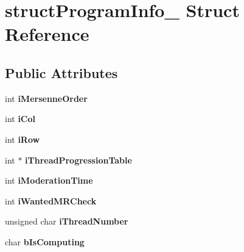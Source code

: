 \hypertarget{structstructProgramInfo__}{
\section{structProgramInfo\_\- Struct Reference}
\label{structstructProgramInfo__}
}
\subsection*{Public Attributes}
\begin{DoxyCompactItemize}
\item 
\hypertarget{structstructProgramInfo___a429213cd5f97e2a1c42e57535ade034a}{
int {\bfseries iMersenneOrder}}
\label{structstructProgramInfo___a429213cd5f97e2a1c42e57535ade034a}

\item 
\hypertarget{structstructProgramInfo___a6d8f0f882c5260a07f9ea3899a46e49b}{
int {\bfseries iCol}}
\label{structstructProgramInfo___a6d8f0f882c5260a07f9ea3899a46e49b}

\item 
\hypertarget{structstructProgramInfo___aaa05cb1158b9032e34f8db08cae61b48}{
int {\bfseries iRow}}
\label{structstructProgramInfo___aaa05cb1158b9032e34f8db08cae61b48}

\item 
\hypertarget{structstructProgramInfo___ac6e5ce18b66d9dfc7efd9cbd440dee56}{
int $\ast$ {\bfseries iThreadProgressionTable}}
\label{structstructProgramInfo___ac6e5ce18b66d9dfc7efd9cbd440dee56}

\item 
\hypertarget{structstructProgramInfo___a0dad35300d4ce2b4eea6fbd02172d537}{
int {\bfseries iModerationTime}}
\label{structstructProgramInfo___a0dad35300d4ce2b4eea6fbd02172d537}

\item 
\hypertarget{structstructProgramInfo___a158798375dbfaef135d7da2348318184}{
int {\bfseries iWantedMRCheck}}
\label{structstructProgramInfo___a158798375dbfaef135d7da2348318184}

\item 
\hypertarget{structstructProgramInfo___a5f17b217926560fa2bc4df0532cd414d}{
unsigned char {\bfseries iThreadNumber}}
\label{structstructProgramInfo___a5f17b217926560fa2bc4df0532cd414d}

\item 
\hypertarget{structstructProgramInfo___a96467fa0675dd5fed4922824a36f22f1}{
char {\bfseries bIsComputing}}
\label{structstructProgramInfo___a96467fa0675dd5fed4922824a36f22f1}


\end{DoxyCompactItemize}
